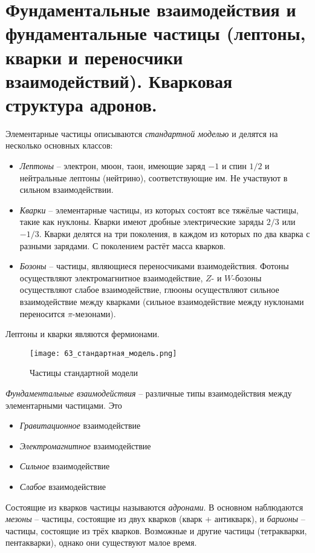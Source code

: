 \section{Фундаментальные взаимодействия и фундаментальные частицы (лептоны, кварки и переносчики
взаимодействий). Кварковая структура адронов.}

Элементарные частицы описываются \textit{стандартной моделью} и делятся на несколько основных классов:

\begin{itemize}
    \item \textit{Лептоны} -- электрон, мюон, таон, имеющие заряд $-1$ и спин $1 / 2$ и нейтральные лептоны (нейтрино), соответствующие им. Не участвуют в сильном взаимодействии.
    \item \textit{Кварки} -- элементарные частицы, из которых состоят все тяжёлые частицы, такие как нуклоны. Кварки имеют дробные электрические заряды $2 / 3$ или $- 1 / 3$. Кварки делятся на три поколения, в каждом из которых по два кварка с разными зарядами. С поколением растёт масса кварков.
    \item \textit{Бозоны} -- частицы, являющиеся переносчиками взаимодействия. Фотоны осуществляют электромагнитное взаимодействие, $Z$- и $W$-бозоны осуществляют слабое взаимодействие, глюоны осуществляют сильное взаимодействие между кварками (сильное взаимодействие между нуклонами переносится $\pi$-мезонами). 
\end{itemize}

\noindent
Лептоны и кварки являются фермионами.

\begin{figure}[htbp]
    \centering
    \texttt{[image: 63\_стандартная\_модель.png]}
    \caption{Частицы стандартной модели}
    \label{fig:стандартная модель}
\end{figure}

\textit{Фундаментальные взаимодействия} -- различные типы взаимодействия между элементарными частицами. Это

\begin{itemize}
    \item \textit{Гравитационное} взаимодействие
    \item \textit{Электромагнитное} взаимодействие
    \item \textit{Сильное} взаимодействие
    \item \textit{Слабое} взаимодействие
\end{itemize}

Состоящие из кварков частицы называются \textit{адронами}. В основном наблюдаются \textit{мезоны} -- частицы, состоящие из двух кварков (кварк + антикварк), и \textit{барионы} -- частицы, состоящие из трёх кварков. Возможные и другие частицы (тетракварки, пентакварки), однако они существуют малое время.

